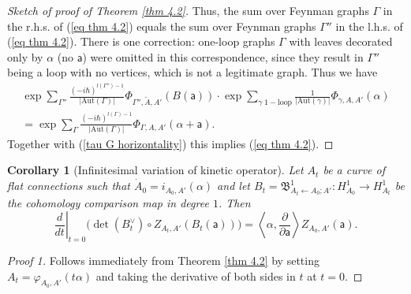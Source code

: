 \documentclass[11pt,a4paper]{amsart}
\theoremstyle{plain} %
\newtheorem{cor}[thm]{Corollary}
\theoremstyle{definition}
\theoremstyle{remark}
\newcommand{\mr}{\mathrm}
\newcommand{\sfa}{\mathsf{a}}
\newcommand{\bt}{\bullet}
\newcommand{\ra}{\rightarrow}
\newcommand{\til}{\widetilde}
\newcommand{\la}{\leftarrow}
\newcommand{\BB}{\mathfrak{B}}
\begin{document}
{\begin{proof}[Sketch of proof of Theorem \ref{thm 4.2}]
Thus, the sum over Feynman graphs $\Gamma$ in the r.h.s. of (\ref{eq thm 4.2}) equals the sum over Feynman graphs $\Gamma''$ in the l.h.s. of (\ref{eq thm 4.2}). There is one correction: one-loop graphs $\Gamma$ with leaves decorated only by $\alpha$ (no $\sfa$) were omitted in this correspondence, since they result in $\Gamma''$ being a loop with no vertices, which is not a legitimate graph. Thus we have
\begin{multline}
\exp\sum_{\Gamma''}\frac{(-i\hbar)^{l(\Gamma'')-1}}{|\mr{Aut}(\Gamma)|}\Phi_{\Gamma'',\til{A},A'}(B(\sfa))\cdot 
\exp\sum_{\gamma\;\mr{1-loop}} \frac{1}{|\mr{Aut}(\gamma)|}\Phi_{\gamma,A,A'}(\alpha)
\\
=\exp\sum_{\Gamma}\frac{(-i\hbar)^{l(\Gamma)-1}}{|\mr{Aut}(\Gamma)|}\Phi_{\Gamma,A,A'}(\alpha+\sfa) .
\end{multline}
Together with (\ref{tau G horizontality}) this implies (\ref{eq thm 4.2}).
\end{proof}




\begin{cor}[Infinitesimal variation of kinetic operator]
\label{cor: variation of kin operator}
    Let $A_t$ be a curve of flat connections such that $\dot{A}_0 = i_{A_0,A'}(\alpha)$ and let $B_t =\BB^1_{A_t \la A_0;A'}\colon H^1_{A_0}\ra H^1_{A_t}$ be the cohomology comparison map in degree $1$. Then 
    \begin{equation}\label{variation of kin operator}
        \left.\frac{d}{dt}\right|_{t=0} \Big(\det(B_t^\vee)\circ Z_{A_t,A'}( B_t (\sfa))\Big) = \left\langle  \alpha, \frac{\partial}{\partial \sfa} \right\rangle Z_{A_0,A'}(\sfa).
    \end{equation}
\end{cor}
\begin{proof}[Proof 1]
Follows immediately from Theorem \ref{thm 4.2} by setting $A_t = \varphi_{A_0,A'}(t \alpha)$ and taking the derivative of both sides in $t$ at $t=0$.
\end{proof}

}
\end{document}
